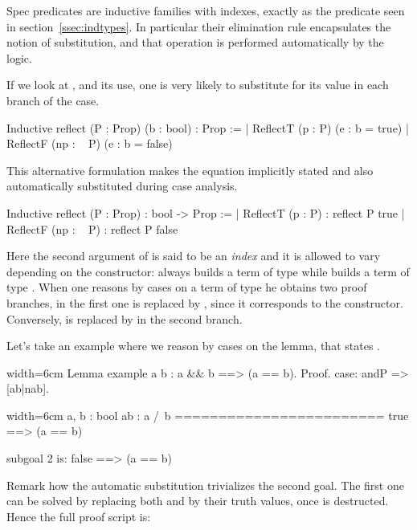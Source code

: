 Spec predicates are inductive families with indexes, exactly
as the  predicate seen in section~\ref{ssec:indtypes}.
In particular their elimination rule encapsulates the notion
of substitution, and that operation is performed automatically by
the logic.

If we look at , and its use, one is very likely to substitute 
for its value in each branch of the case.

\begin{coq}{}{}
Inductive reflect (P : Prop) (b : bool) : Prop :=
| ReflectT (p : P)    (e : b = true)
| ReflectF (np : ~ P) (e : b = false)
\end{coq}

This alternative formulation makes the equation implicitly stated and
also automatically substituted during case analysis.

\begin{coq}{}{}
Inductive reflect (P : Prop) : bool -> Prop :=
| ReflectT (p : P)    : reflect P true
| ReflectF (np : ~ P) : reflect P false
\end{coq}

Here the second argument of  is said to be an \emph{index}
and it is allowed to vary depending on the constructor:  always
builds a term of type  while  builds
a term of type .  When one reasons
by cases on a term of type  he obtains two proof
branches, in the first one  is replaced by , since it
corresponds to the  constructor.  Conversely,
 is replaced by  in the second branch.

Let's take an example where we reason by cases on the  lemma,
that states .

\begin{coq-left}{}{width=6cm}
Lemma example a b :
  a && b ==> (a == b).
Proof.
case: andP => [ab|nab].
$~$
$~$
\end{coq-left}
\begin{coqout-right}{}{width=6cm}
a, b : bool
ab : a /\ b
========================
true ==> (a == b)

subgoal 2 is:
false ==> (a == b)
\end{coqout-right}

Remark how the automatic substitution trivializes the
second goal.  The first one can be solved by replacing
both  and  by their truth values, once 
is destructed.  Hence the full proof script is:

